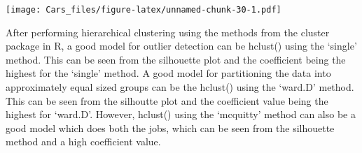 \documentclass[
]{article}
\begin{document}
\texttt{[image: Cars\_files/figure-latex/unnamed-chunk-30-1.pdf]}

After performing hierarchical clustering using the methods from the
cluster package in R, a good model for outlier detection can be hclust()
using the `single' method. This can be seen from the silhouette plot and
the coefficient being the highest for the `single' method. A good model
for partitioning the data into approximately equal sized groups can be
the hclust() using the `ward.D' method. This can be seen from the
silhoutte plot and the coefficient value being the highest for `ward.D'.
However, hclust() using the `mcquitty' method can also be a good model
which does both the jobs, which can be seen from the silhouette method
and a high coefficient value.
\end{document}
